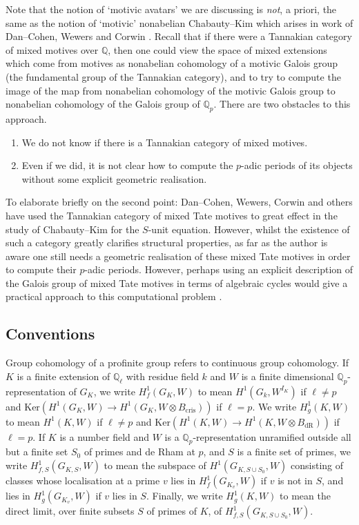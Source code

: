 \documentclass[11pt]{amsart}
\def\Q{\mathbb Q}
\theoremstyle{plain}
\theoremstyle{definition}
\DeclareMathOperator{\dR}{dR}
\newcommand{\Ker}{\mathrm{Ker}}
\newcommand{\cris}{\mathrm{cris}}
\begin{document}
Note that the notion of `motivic avatars' we are discussing is \textit{not}, a priori, the same as the notion of `motivic' nonabelian Chabauty--Kim which arises in work of Dan--Cohen, Wewers and Corwin \cite{DCW} \cite{CDC}. Recall that if there were a Tannakian category of mixed motives over $\Q $, then one could view the space of mixed extensions which come from motives as nonabelian cohomology of a motivic Galois group (the fundamental group of the Tannakian category), and to try to compute the image of the map from nonabelian cohomology of the motivic Galois group to nonabelian cohomology of the Galois group of $\Q _p $. There are two obstacles to this approach.
\begin{enumerate}
\item We do not know if there is a Tannakian category of mixed motives.
\item Even if we did, it is not clear how to compute the $p$-adic periods of its objects without some explicit geometric realisation.
\end{enumerate}
To elaborate briefly on the second point: Dan--Cohen, Wewers, Corwin \cite{DCW} \cite{CDC} and others have used the Tannakian category of mixed Tate motives to great effect in the study of Chabauty--Kim for the $S$-unit equation. However, whilst the existence of such a category greatly clarifies structural properties, as far as the author is aware one still needs a geometric realisation of these mixed Tate motives in order to compute their $p$-adic periods. However, perhaps using an explicit description of the Galois group of mixed Tate motives in terms of algebraic cycles would give a practical approach to this computational problem \cite{bloch}.

\subsection{Conventions}
Group cohomology of a profinite group refers to continuous group cohomology. If $K$ is a finite extension of $\Q _{\ell }$ with residue field $k$ and $W$ is a finite dimensional $\Q _p $-representation of $G_K$, we write $H^1 _f (G_K ,W)$ to mean $H^1 (G_k ,W^{I_K})$ if $\ell \neq p$ and $\Ker (H^1 (G_K ,W)\to H^1 (G_K ,W\otimes B_{\cris }))$ if $\ell = p$. We write $H^1 _g (K ,W)$ to mean $H^1 (K,W)$ if $\ell \neq p$ and $\Ker (H^1 (K,W)\to H^1 (K,W\otimes B_{\dR}))$ if $\ell = p $. If $K$ is a number field and $W$ is a $\Q _p$-representation unramified outside all but a finite set $S_0$ of primes and de Rham at $p$, and $S$ is a finite set of primes, we write $H^1 _{f,S}(G_{K,S},W)$ to mean the subspace of $H^1 (G_{K,S\cup S_0 },W)$ consisting of classes whose localisation at a prime $v$ lies in $H^1 _f (G_{K_v},W)$ if $v$ is not in $S$, and lies in $H^1 _g (G_{K_v },W)$ if $v$ lies in $S$. Finally, we write  $H^1 _g (K,W)$ to mean the direct limit, over finite subsets $S$ of primes of $K$, of $H^1 _{f,S}(G_{K,S\cup S_0 },W)$.
\end{document}
